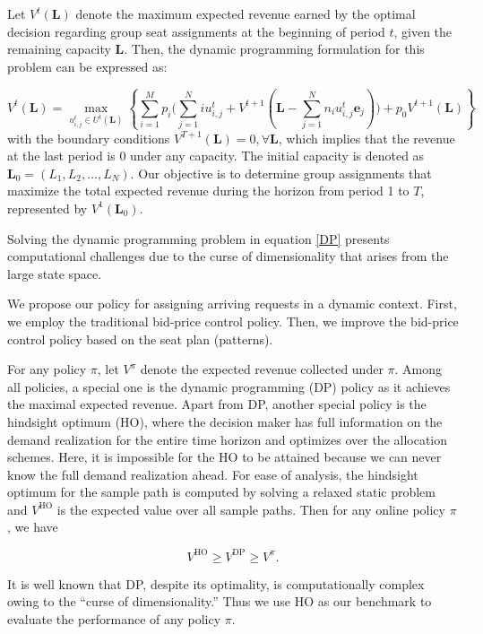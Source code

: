 Let $V^{t}(\mathbf{L})$ denote the maximum expected revenue earned by the optimal decision regarding group seat assignments at the beginning of period $t$, given the remaining capacity $\mathbf{L}$. Then, the dynamic programming formulation for this problem can be expressed as:

\begin{equation}\label{DP}
V^{t}(\mathbf{L}) = \max_{u_{i,j}^{t} \in U^{t}(\mathbf{L})}\left\{\sum_{i=1}^{M} p_i \bigl( \sum_{j=1}^{N} i u_{i,j}^{t} + V^{t+1}(\mathbf{L} - \sum_{j=1}^{N} n_i u_{i,j}^{t}\mathbf{e}_j)\bigr) + p_0 V^{t+1}(\mathbf{L})\right\}
\end{equation}
with the boundary conditions $V^{T+1}(\mathbf{L}) = 0, \forall \mathbf{L}$, which implies that the revenue at the last period is 0 under any capacity. The initial capacity is denoted as $\mathbf{L}_{0} = (L_1, L_2, \ldots, L_N)$. Our objective is to determine group assignments that maximize the total expected revenue during the horizon from period 1 to $T$, represented by $V^{1}(\mathbf{L}_{0})$.


Solving the dynamic programming problem in equation \eqref{DP} presents computational challenges due to the curse of dimensionality that arises from the large state space.

We propose our policy for assigning arriving requests in a dynamic context. First, we employ the traditional bid-price control policy. Then, we improve the bid-price control policy based on the seat plan (patterns).

For any policy $\pi$, let $V^{\pi}$ denote the expected revenue collected under $\pi$. Among all policies, a special one is the dynamic programming (DP) policy as it achieves the maximal expected revenue. Apart from DP, another special policy is the hindsight optimum (HO), where the decision
maker has full information on the demand realization for the entire time horizon and optimizes
over the allocation schemes. Here, it is impossible for the HO to be attained because we can never know the full demand realization ahead. For ease of analysis, the hindsight optimum for the sample path is computed by solving a relaxed static problem and $V^{\text{HO}}$ is the expected value over all sample paths. Then for any online policy $\pi$, we have 

$$V^{\text{HO}} \geq V^{\text{DP}} \geq V^{\pi}.$$

It is well known that DP, despite its optimality, is computationally complex owing to the ``curse
of dimensionality.'' Thus we use HO as our benchmark to evaluate the performance of any policy $\pi$.


